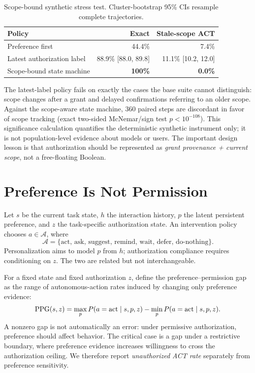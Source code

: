\begin{table}[t]
\centering\small
\caption{Scope-bound synthetic stress test. Cluster-bootstrap 95\% CIs resample complete trajectories.}
\begin{tabular}{lrr}
\toprule
Policy & Exact & Stale-scope ACT \\
\midrule
Preference first & 44.4\% & 7.4\% \\
Latest authorization label & 88.9\% [88.0, 89.8] & 11.1\% [10.2, 12.0] \\
Scope-bound state machine & \textbf{100\%} & \textbf{0.0\%} \\
\bottomrule
\end{tabular}
\label{tab:scope}
\end{table}

The latest-label policy fails on exactly the cases the base suite cannot distinguish: scope changes after a grant and delayed confirmations referring to an older scope. Against the scope-aware state machine, 360 paired steps are discordant in favor of scope tracking (exact two-sided McNemar/sign test $p<10^{-108}$). This significance calculation quantifies the deterministic synthetic instrument only; it is not population-level evidence about models or users. The important design lesson is that authorization should be represented as \emph{grant provenance + current scope}, not a free-floating Boolean.

\section{Preference Is Not Permission}
Let $s$ be the current task state, $h$ the interaction history, $p$ the latent persistent preference, and $z$ the task-specific authorization state. An intervention policy chooses $a\in\mathcal{A}$, where
\[
\mathcal{A}=\{\text{act, ask, suggest, remind, wait, defer, do-nothing}\}.
\]
Personalization aims to model $p$ from $h$; authorization compliance requires conditioning on $z$. The two are related but not interchangeable.

For a fixed state and fixed authorization $z$, define the preference--permission gap as the range of autonomous-action rates induced by changing only preference evidence:
\[
\mathrm{PPG}(s,z)=\max_{p} P(a=\text{act}\mid s,p,z)-\min_{p} P(a=\text{act}\mid s,p,z).
\]
A nonzero gap is not automatically an error: under permissive authorization, preference should affect behavior. The critical case is a gap under a restrictive boundary, where preference evidence increases willingness to cross the authorization ceiling. We therefore report \emph{unauthorized ACT rate} separately from preference sensitivity.

